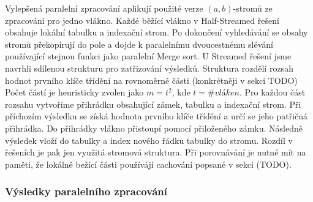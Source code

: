 Vylepšená paralelní zpracování aplikují použité verze $(a, b)$-stromů ze zpracování pro jedno vlákno. 
Každé běžící vlákno v Half-Streamed řešení obsahuje lokální tabulku a indexační strom. 
Po dokončení vyhledávání se obsahy stromů překopírují do pole a dojde k paralelnímu dvoucestnému slévání používající stejnou funkci jako paralelní Merge sort. 
U Streamed řešení jsme navrhli sdílenou strukturu pro zatřizování výsledků.
Struktura rozdělí rozsah hodnot prvního klíče třídění na rovnoměrné části (konkrétněji v sekci TODO)
Počet částí je heuristicky zvolen jako $m=t^2$, kde $t=\#vláken$. 
Pro každou část rozsahu vytvoříme přihrádku obsahující zámek, tabulku a indexační strom.
Při příchozím výsledku se získá hodnota prvního klíče třídění a určí se jeho patřičná přihrádka. 
Do přihrádky vlákno přistoupí pomocí přiloženého zámku.
Následně výsledek vloží do tabulky a index nového řádku tabulky do stromu.
Rozdíl v řešeních je pak jen využitá stromová struktura.
Při porovnávání je nutné mít na paměti, že lokálně bežící části používájí cachování popsané v sekci (TODO).  

\subsubsection{Výsledky paralelního zpracování}

